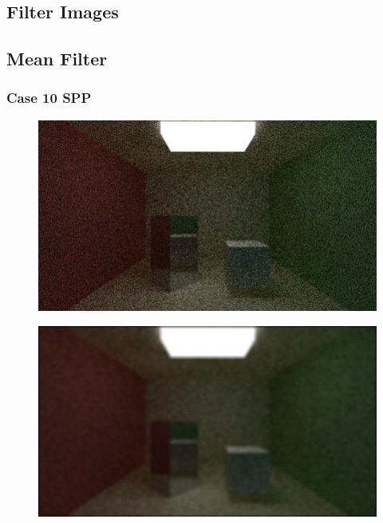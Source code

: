 \documentclass[titlepage,12pt]{report}
\begin{document}
\begin{appendices}
\chapter{Filter Images}

\section{Mean Filter}\label{mean_filter_appendix}

\subsection{Case 10 SPP}

\begin{figure}[H]
	\centering
  	\includegraphics[scale=0.5]{media/cornell_normal_10.png}
  	\label{ap1}
\end{figure}

\begin{figure}[H]
	\centering
  	\includegraphics[scale=0.5]{media/mean/cornell_normal_10_mean_filter_11.png}
  	\label{ap2}
\end{figure}


\end{appendices}
\end{document}
